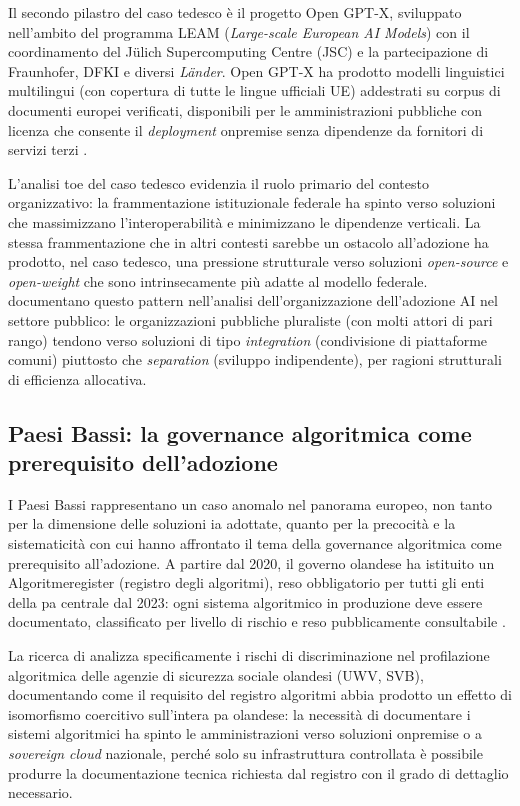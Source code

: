 Il secondo pilastro del caso tedesco è il progetto Open GPT-X,
sviluppato nell'ambito del programma LEAM (\textit{Large-scale European AI Models})
con il coordinamento del Jülich Supercomputing Centre (JSC) e la partecipazione
di Fraunhofer, DFKI e diversi \textit{Länder}. Open GPT-X ha prodotto modelli
linguistici multilingui (con copertura di tutte le lingue ufficiali UE) addestrati
su corpus di documenti europei verificati, disponibili per le amministrazioni
pubbliche con licenza che consente il \textit{deployment} \gls{onpremise} senza
dipendenze da fornitori di servizi terzi \parencite{EUParl_TechSovereignty2025}.

L'analisi \gls{toe} del caso tedesco evidenzia il ruolo primario del contesto
organizzativo: la frammentazione istituzionale federale ha spinto verso
soluzioni che massimizzano l'interoperabilità e minimizzano le dipendenze
verticali. La stessa frammentazione che in altri contesti sarebbe un ostacolo
all'adozione ha prodotto, nel caso tedesco, una pressione strutturale verso
soluzioni \textit{open-source} e \textit{open-weight} che sono intrinsecamente
più adatte al modello federale. \textcite{Selten2024} documentano questo pattern
nell'analisi dell'organizzazione dell'adozione AI nel settore pubblico: le
organizzazioni pubbliche pluraliste (con molti attori di pari rango) tendono
verso soluzioni di tipo \textit{integration} (condivisione di piattaforme comuni)
piuttosto che \textit{separation} (sviluppo indipendente), per ragioni strutturali
di efficienza allocativa.

\subsection{Paesi Bassi: la governance algoritmica come prerequisito dell'adozione}

I Paesi Bassi rappresentano un caso anomalo nel panorama europeo, non tanto per la
dimensione delle soluzioni \gls{ia} adottate, quanto per la precocità e la sistematicità
con cui hanno affrontato il tema della governance algoritmica come
prerequisito all'adozione. A partire dal 2020, il governo olandese ha istituito
un Algoritmeregister (registro degli algoritmi), reso obbligatorio per
tutti gli enti della \gls{pa} centrale dal 2023: ogni sistema algoritmico in produzione
deve essere documentato, classificato per livello di rischio e reso pubblicamente
consultabile \parencite{HaitsmaLucas2025}.

La ricerca di \textcite{HaitsmaLucas2025} analizza specificamente i rischi
di discriminazione nel profilazione algoritmica delle agenzie di sicurezza sociale
olandesi (UWV, SVB), documentando come il requisito del registro algoritmi abbia
prodotto un effetto di isomorfismo coercitivo sull'intera \gls{pa} olandese:
la necessità di documentare i sistemi algoritmici ha spinto le amministrazioni
verso soluzioni \gls{onpremise} o a \textit{sovereign cloud} nazionale,
perché solo su infrastruttura controllata è possibile produrre la documentazione
tecnica richiesta dal registro con il grado di dettaglio necessario.

